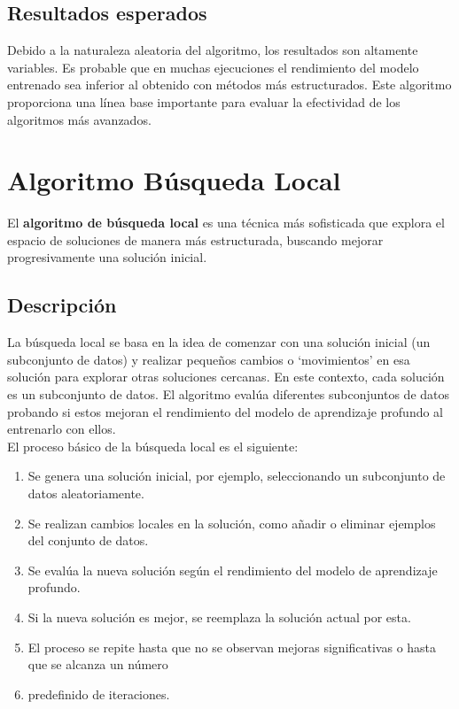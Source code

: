 \subsection{Resultados esperados}\label{subsec:resultados-esperados}
Debido a la naturaleza aleatoria del algoritmo, los resultados son altamente variables.
Es probable que en muchas ejecuciones el rendimiento del modelo entrenado sea inferior al obtenido con métodos más
estructurados.
Este algoritmo proporciona una línea base importante para evaluar la efectividad de los algoritmos más avanzados.


\section{Algoritmo Búsqueda Local}\label{sec:algoritmo-busqueda-local}
El \textbf{algoritmo de búsqueda local} es una técnica más sofisticada que explora el espacio de soluciones de manera
más estructurada, buscando mejorar progresivamente una solución inicial.

\subsection{Descripción}\label{subsec:descripcion2}
La búsqueda local se basa en la idea de comenzar con una solución inicial (un subconjunto de datos) y realizar pequeños
cambios o `movimientos' en esa solución para explorar otras soluciones cercanas.
En este contexto, cada solución es un subconjunto de datos.
El algoritmo evalúa diferentes subconjuntos de datos probando si estos mejoran el rendimiento del modelo de aprendizaje
profundo al entrenarlo con ellos. \\[6pt]


El proceso básico de la búsqueda local es el siguiente:
\begin{enumerate}
    \item Se genera una solución inicial, por ejemplo, seleccionando un subconjunto de datos aleatoriamente.
    \item Se realizan cambios locales en la solución, como añadir o eliminar ejemplos del conjunto de datos.
    \item Se evalúa la nueva solución según el rendimiento del modelo de aprendizaje profundo.
    \item Si la nueva solución es mejor, se reemplaza la solución actual por esta.
    \item El proceso se repite hasta que no se observan mejoras significativas o hasta que se alcanza un número
    \item predefinido de iteraciones.
\end{enumerate}

